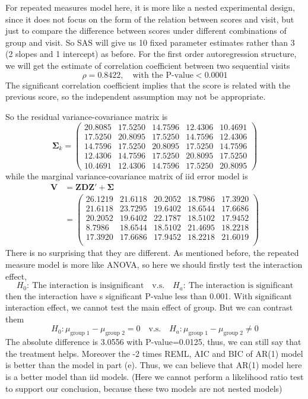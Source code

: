\documentclass[letterpaper, 12pt]{article}
\newcommand{\ba}{$$\begin{aligned}}
\newcommand{\ea}{\end{aligned}$$}
\newcommand{\lma}{\left(\begin{matrix}}
\newcommand{\rma}{\end{matrix}\right)}
\begin{document}
For repeated measures model here, it is more like a nested experimental design, since it does not focus on the form of the relation between scores and visit, but just to compare the difference between scores under different combinations of group and visit. So SAS will give us 10 fixed parameter estimates rather than 3 (2 slopes and 1 intercept) as before. For the first order autoregression structure, we will get the estimate of correlation coefficient between two sequential visits
$$
\rho=0.8422,\quad\text{with the P-value}<0.0001
$$
The significant correlation coefficient implies that the score is related with the previous score, so the independent assumption may not be appropriate.


So the residual variance-covariance matrix is
$$
\bm{\Sigma}_k=\lma
20.8085 &17.5250 &14.7596 &12.4306 &10.4691 \\
17.5250 &20.8095 &17.5250 &14.7596 &12.4306 \\
14.7596 &17.5250 &20.8095 &17.5250 &14.7596 \\
12.4306 &14.7596 &17.5250 &20.8095 &17.5250 \\
10.4691 &12.4306 &14.7596 &17.5250 &20.8095 
\rma
$$
while the marginal variance-covariance matrix of iid error model is
\ba
\bm{V}&=\bm{ZDZ}'+\bm{\Sigma}\\
&=\lma
26.1219 &21.6118 & 20.2052 &18.7986 &17.3920\\
21.6118 &23.7295 & 19.6402 &18.6544& 17.6686\\
20.2052 &19.6402& 22.1787 &18.5102& 17.9452\\
8.7986 &18.6544 &18.5102 &21.4695 &18.2218\\
17.3920 &17.6686& 17.9452 &18.2218& 21.6019\\
\rma
\ea
There is no surprising that they are different. As mentioned before, the repeated measure model is more like ANOVA, so here we should firstly test the interaction effect,
$$
H_0:~\text{The interaction is insignificant}\quad\text{v.s.}\quad H_a:~\text{The interaction is significant}
$$
then the interaction have s significant P-value less than 0.001. With significant interaction effect, we cannot test the main effect of group. But we can contrast them
$$
H_0:\mu_\text{group 1}-\mu_\text{group 2}=0\quad\text{v.s.}\quad H_a:\mu_\text{group 1}-\mu_\text{group 2}\not=0
$$
The absolute difference is 3.0556 with P-value=0.0125, thus, we can still say that the treatment helps. Moreover the -2 times REML, AIC and BIC of AR(1) model is better than the model in part (e). Thus, we can believe that AR(1) model here is a better model than iid models. (Here we cannot perform a likelihood ratio test to support our conclusion, because these two models are not nested models)
\end{document}
